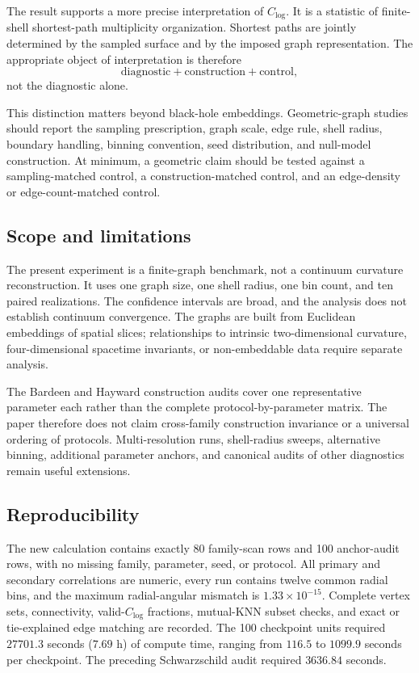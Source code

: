 \documentclass[11pt]{article}
\newcommand{\clog}{C_{\log}}
\begin{document}
The result supports a more precise interpretation of $\clog$. It is a statistic
of finite-shell shortest-path multiplicity organization. Shortest paths are
jointly determined by the sampled surface and by the imposed graph
representation. The appropriate object of interpretation is therefore
\begin{equation}
    \text{diagnostic} + \text{construction} + \text{control},
\end{equation}
not the diagnostic alone.

This distinction matters beyond black-hole embeddings. Geometric-graph studies
should report the sampling prescription, graph scale, edge rule, shell radius,
boundary handling, binning convention, seed distribution, and null-model
construction. At minimum, a geometric claim should be tested against a
sampling-matched control, a construction-matched control, and an edge-density
or edge-count-matched control.

\subsection{Scope and limitations}

The present experiment is a finite-graph benchmark, not a continuum curvature
reconstruction. It uses one graph size, one shell radius, one bin count, and ten
paired realizations. The confidence intervals are broad, and the analysis does
not establish continuum convergence. The graphs are built from Euclidean
embeddings of spatial slices; relationships to intrinsic two-dimensional
curvature, four-dimensional spacetime invariants, or non-embeddable data require
separate analysis.

The Bardeen and Hayward construction audits cover one representative parameter
each rather than the complete protocol-by-parameter matrix. The paper therefore
does not claim cross-family construction invariance or a universal ordering of
protocols. Multi-resolution runs, shell-radius sweeps, alternative binning,
additional parameter anchors, and canonical audits of other diagnostics remain
useful extensions.

\subsection{Reproducibility}

The new calculation contains exactly 80 family-scan rows and 100 anchor-audit
rows, with no missing family, parameter, seed, or protocol. All primary and
secondary correlations are numeric, every run contains twelve common radial
bins, and the maximum radial-angular mismatch is $1.33\times10^{-15}$. Complete
vertex sets, connectivity, valid-$\clog$ fractions, mutual-KNN subset checks,
and exact or tie-explained edge matching are recorded. The 100 checkpoint units
required $27701.3$ seconds ($7.69$ h) of compute time, ranging from $116.5$ to
$1099.9$ seconds per checkpoint. The preceding Schwarzschild audit required
$3636.84$ seconds.
\end{document}

